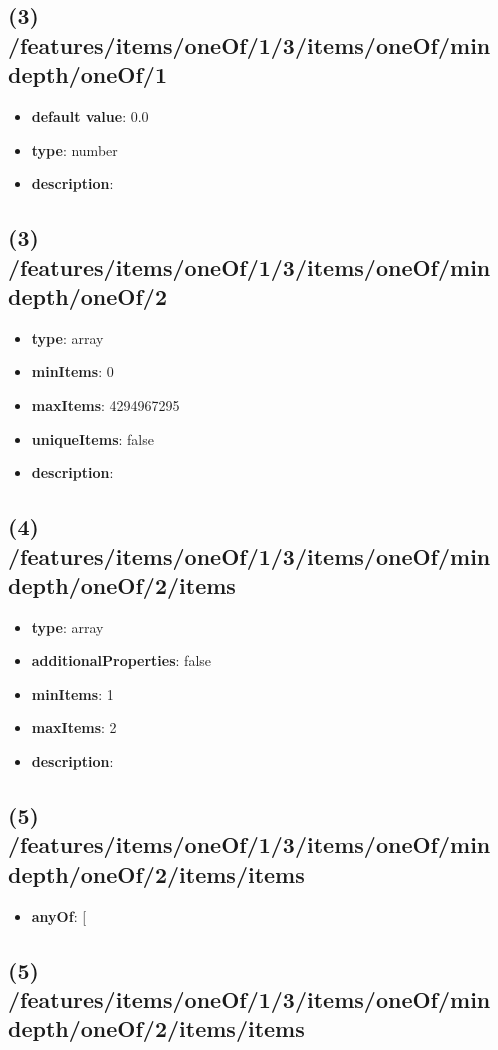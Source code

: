 \subsection{(3) /features/items/oneOf/1/3/items/oneOf/min depth/oneOf/1}
\begin{itemize}[leftmargin=3em]\item {\bf default value}: 0.0
\item {\bf type}: number
\item {\bf description}: 
\end{itemize}\subsection{(3) /features/items/oneOf/1/3/items/oneOf/min depth/oneOf/2}
\begin{itemize}[leftmargin=3em]\item {\bf type}: array
\item {\bf minItems}: 0
\item {\bf maxItems}: 4294967295
\item {\bf uniqueItems}: false
\item {\bf description}: 
\end{itemize}\subsection{(4) /features/items/oneOf/1/3/items/oneOf/min depth/oneOf/2/items}
\begin{itemize}[leftmargin=4em]\item {\bf type}: array
\item {\bf additionalProperties}: false
\item {\bf minItems}: 1
\item {\bf maxItems}: 2
\item {\bf description}: 
\end{itemize}\subsection{(5) /features/items/oneOf/1/3/items/oneOf/min depth/oneOf/2/items/items}
\begin{itemize}[leftmargin=5em]\item {\bf anyOf}: [\end{itemize}\subsection{(5) /features/items/oneOf/1/3/items/oneOf/min depth/oneOf/2/items/items}
